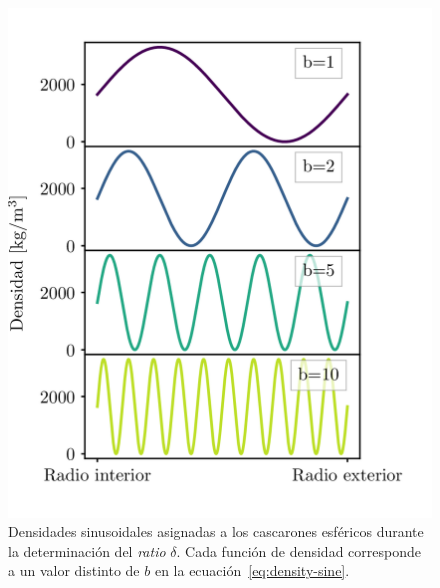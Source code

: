 \begin{figure}
\centering
\includegraphics[width=0.5\linewidth]{figs/tesseroids-variable-density/sine-densities.png}
\caption{
    Densidades sinusoidales asignadas a los cascarones esféricos durante la
    determinación del \emph{ratio} $\delta$.
    Cada función de densidad corresponde a un valor distinto de $b$ en la
    ecuación~\ref{eq:density-sine}.
}
\label{fig:sine-densities}
\end{figure}

